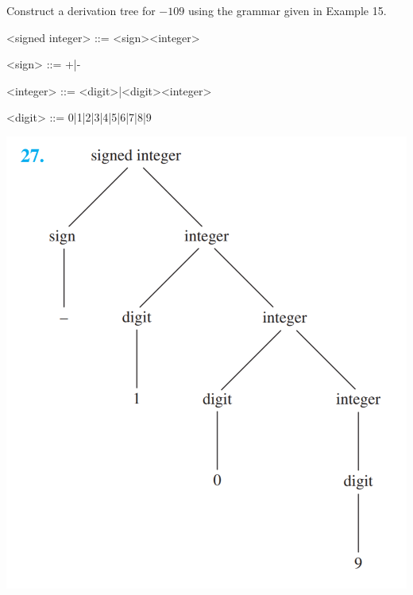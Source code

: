 \documentclass[../main.tex]{subfiles}
\begin{document}
Construct a derivation tree for $-109$ using the grammar given in Example 15.

\begin{grammar}
<signed integer> ::= <sign><integer>

<sign> ::= +|-

<integer> ::= <digit>|<digit><integer>

<digit> ::= 0|1|2|3|4|5|6|7|8|9
\end{grammar}

\solution
\includegraphics[width=\textwidth]{img/27.png}
\end{document}
